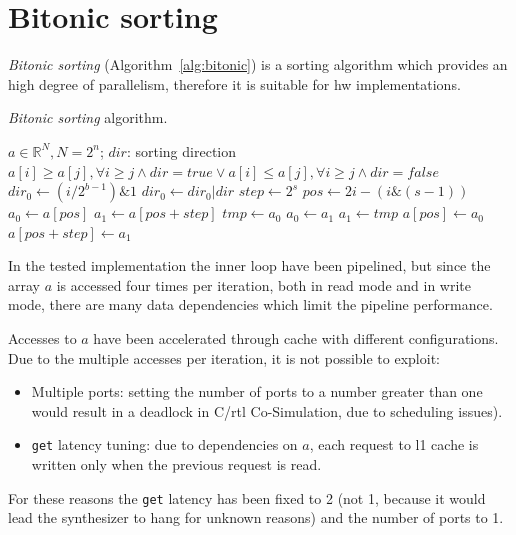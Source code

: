 \documentclass[11pt,a4paper,oneside]{memoir}
\begin{document}
\section{Bitonic sorting}
\emph{Bitonic sorting} (Algorithm~\ref{alg:bitonic}) is a sorting algorithm
which provides an high degree of parallelism, therefore it is suitable for
\acl{hw} implementations.

\begin{algorithm}
	\caption{\emph{Bitonic sorting} algorithm.}\label{alg:bitonic}
	\begin{algorithmic}
		\Require $a \in \mathbb{R}^N, N = 2^n$; $dir$: sorting direction
		\Ensure $a[i] \geq a[j], \forall i \geq j \wedge dir = true \vee
			a[i] \leq a[j], \forall i \geq j \wedge dir = false$
						\State $dir_0 \gets
							(i/2^{b - 1}) \& 1$
						\State $dir_0 \gets dir_0 | dir$
						\State $step \gets 2^s$
						\State $pos \gets 2 i -
							(i \& (s - 1))$
						\State $a_0 \gets a[pos]$
						\State $a_1 \gets a[pos + step]$
							\State $tmp \gets a_0$
							\State $a_0 \gets a_1$
							\State $a_1 \gets tmp$
						\EndIf
						\State $a[pos] \gets a_0$
						\State $a[pos + step] \gets a_1$
					\EndFor
				\EndFor
			\EndFor
		\EndProcedure
	\end{algorithmic}
\end{algorithm}

In the tested implementation the inner loop have been pipelined, but since the
array $a$ is accessed four times per iteration, both in read mode and in write
mode, there are many data dependencies which limit the pipeline performance.

Accesses to $a$ have been accelerated through cache with different
configurations.
Due to the multiple accesses per iteration, it is not possible to exploit:
\begin{itemize}
	\item Multiple ports: setting the number of ports to a number greater
		than one would result in a deadlock in C/\ac{rtl}
		Co-Simulation, due to scheduling issues).
	\item \texttt{get} latency tuning: due to dependencies on $a$, each
		request to \ac{l1} cache is written only when the previous
		request is read.
\end{itemize}

For these reasons the \texttt{get} latency has been fixed to 2 (not 1, because
it would lead the synthesizer to hang for unknown reasons) and the number of
ports to 1.
\end{document}
